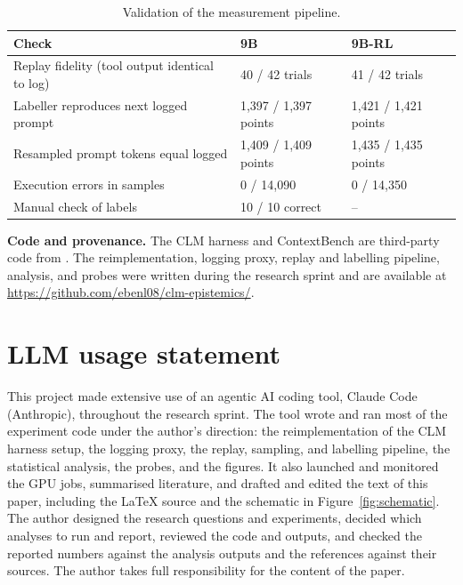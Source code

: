 \documentclass{article}
\begin{document}
\begin{table}[!ht]
  \centering
  \small
  \caption{Validation of the measurement pipeline.}
  \label{tab:validation}
  \begin{tabular}{@{}lll@{}}
    \toprule
    Check & 9B & 9B-RL \\
    \midrule
    Replay fidelity (tool output identical to log) & 40 / 42 trials & 41 / 42 trials \\
    Labeller reproduces next logged prompt & 1{,}397 / 1{,}397 points & 1{,}421 / 1{,}421 points \\
    Resampled prompt tokens equal logged & 1{,}409 / 1{,}409 points & 1{,}435 / 1{,}435 points \\
    Execution errors in samples & 0 / 14{,}090 & 0 / 14{,}350 \\
    Manual check of labels & 10 / 10 correct & -- \\
    \bottomrule
  \end{tabular}
\end{table}

\textbf{Code and provenance.} The CLM harness and ContextBench are third-party code from \citet{shao2026clm}.
The reimplementation, logging proxy, replay and labelling pipeline, analysis, and probes were written during the research sprint and are available at \url{https://github.com/ebenl08/clm-epistemics/}.

\section{LLM usage statement}
\label{app:llm}

This project made extensive use of an agentic AI coding tool, Claude Code (Anthropic), throughout the research sprint.
The tool wrote and ran most of the experiment code under the author's direction: the reimplementation of the CLM harness setup, the logging proxy, the replay, sampling, and labelling pipeline, the statistical analysis, the probes, and the figures.
It also launched and monitored the GPU jobs, summarised literature, and drafted and edited the text of this paper, including the LaTeX source and the schematic in Figure~\ref{fig:schematic}.
The author designed the research questions and experiments, decided which analyses to run and report, reviewed the code and outputs, and checked the reported numbers against the analysis outputs and the references against their sources.
The author takes full responsibility for the content of the paper.
\end{document}

